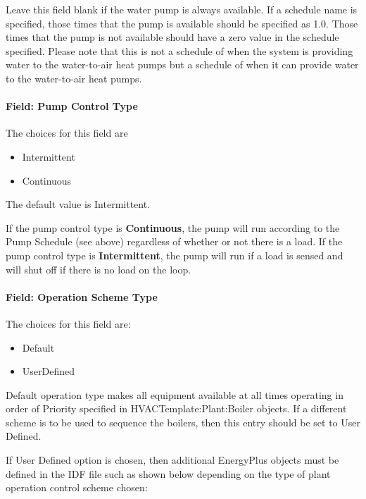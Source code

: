 Leave this field blank if the water pump is always available. If a schedule name is specified, those times that the pump is available should be specified as 1.0. Those times that the pump is not available should have a zero value in the schedule specified. Please note that this is not a schedule of when the system is providing water to the water-to-air heat pumps but a schedule of when it can provide water to the water-to-air heat pumps.

\paragraph{Field: Pump Control Type}\label{field-pump-control-type-2}

The choices for this field are

\begin{itemize}
\item
  Intermittent
\item
  Continuous
\end{itemize}

The default value is Intermittent.

If the pump control type is \textbf{Continuous}, the pump will run according to the Pump Schedule (see above) regardless of whether or not there is a load. If the pump control type is \textbf{Intermittent}, the pump will run if a load is sensed and will shut off if there is no load on the loop.

\paragraph{Field: Operation Scheme Type}\label{field-operation-scheme-type}

The choices for this field are:

\begin{itemize}
\item
  Default
\item
  UserDefined
\end{itemize}

Default operation type makes all equipment available at all times operating in order of Priority specified in HVACTemplate:Plant:Boiler objects. If a different scheme is to be used to sequence the boilers, then this entry should be set to User Defined.

If User Defined option is chosen, then additional EnergyPlus objects must be defined in the IDF file such as shown below depending on the type of plant operation control scheme chosen:

